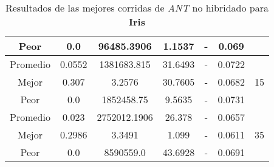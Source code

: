 \begin{table}[h!]
\begin{center}
\begin{tabular}{|c|c|c|c|c|c|c|}
            \cline{1-6}
            Peor & 0.0 & 96485.3906  & 1.1537 & - & 0.069 & \\
        \hline
        \hline
            Promedio  & 0.0552 & 1381683.815 & 31.6493 & - & 0.0722 & \\
            \cline{1-6}
            Mejor & 0.307 & 3.2576  & 30.7605 & - & 0.0682 & 15\\
            \cline{1-6}
            Peor & 0.0 & 1852458.75  & 9.5635 & - & 0.0731 & \\
        \hline
        \hline
            Promedio  & 0.023 & 2752012.1906 & 26.378 & - & 0.0657 & \\
            \cline{1-6}
            Mejor & 0.2986 & 3.3491  & 1.099 & - & 0.0611 & 35\\
            \cline{1-6}
            Peor & 0.0 & 8590559.0  & 43.6928 & - & 0.0691 & \\
        \hline
        \end{tabular}
        \caption{Resultados de las mejores corridas de \emph{ANT} no hibridado para {\bf Iris}}
        \label{tb:tableantalgcsv}
    \end{center}
\end{table}

